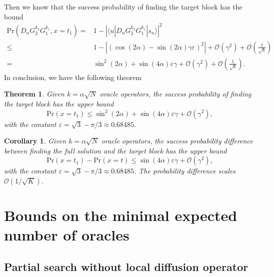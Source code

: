 \documentclass[a4paper,10pt]{article}
\newcommand{\pr}{\mathrm{Pr}}
\newtheorem{theorem}{Theorem}
\newtheorem{corollary}{Corollary}[theorem]
\numberwithin{equation}{section}
\begin{document}
Then we know that the success probability of finding the target block has the bound
\begin{align}
    \pr(D_nG_2^{k_2}G_1^{k_1},x=t_1) = & 1- \left|\langle u|D_nG_2^{k_2}G_1^{k_1}|s_n\rangle\right|^2 \nonumber \\
    \leq & 1- |(\cos(2\alpha)-\sin(2\alpha)\gamma\varepsilon)^2|+ \mathcal O\left(\gamma^2\right) + \mathcal O\left(\frac{1}{\sqrt b}\right) \nonumber \\
    = & \sin^2(2\alpha) + \sin(4\alpha)\varepsilon\gamma + \mathcal O\left(\gamma^2\right) + \mathcal O\left(\frac{1}{\sqrt b}\right).
\end{align}
In conclusion, we have the following theorem
\begin{theorem}
    Given $k = \alpha\sqrt N$ oracle operators, the success probability of finding the target block has the upper bound
    \begin{equation}
        \pr(x=t_1)\leq \sin^2(2\alpha) + \sin(4\alpha)\varepsilon\gamma + \mathcal O\left(\gamma^2\right),
    \end{equation}
    with the constant $\varepsilon = \sqrt 3 - \pi/3 \approx 0.68485$.
\end{theorem}

\begin{corollary}
    Given $k = \alpha\sqrt N$ oracle operators, the success probability difference between finding the full solution and the target block has the upper bound
    \begin{equation}
        \pr(x=t_1) - \pr(x=t) \leq \sin(4\alpha)\varepsilon\gamma + \mathcal O\left(\gamma^2\right),
    \end{equation}
    with the constant $\varepsilon = \sqrt 3 - \pi/3 \approx 0.68485$. The probability difference scales $\mathcal O(1/\sqrt K)$.
\end{corollary}

\section{Bounds on the minimal expected number of oracles}

\subsection{Partial search without local diffusion operator}
\end{document}

